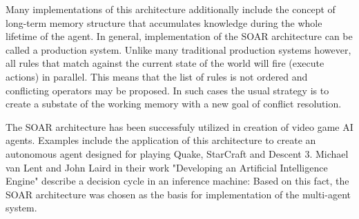 Many implementations of this architecture additionally include the concept of long-term memory structure that accumulates knowledge during the whole lifetime of the agent.
In general, implementation of the SOAR architecture can be called a production system.
Unlike many traditional production systems however, all rules that match against the current state of the world will fire (execute actions) in parallel.
This means that the list of rules is not ordered and conflicting operators may be proposed.
In such cases the usual strategy is to create a substate of the working memory with a new goal of conflict resolution.

The SOAR architecture has been successfuly utilized in creation of video game AI agents.
Examples include the application of this architecture to create an autonomous agent designed for playing Quake\cite{laird2001knows}, StarCraft\cite{turner2013soar-sc} and Descent 3\cite{van1999developing}.
Michael van Lent and John Laird in their work "Developing an Artificial Intelligence Engine"\cite{van1999developing} describe a decision cycle in an inference machine:
Based on this fact, the SOAR architecture was chosen as the basis for implementation of the multi-agent system.